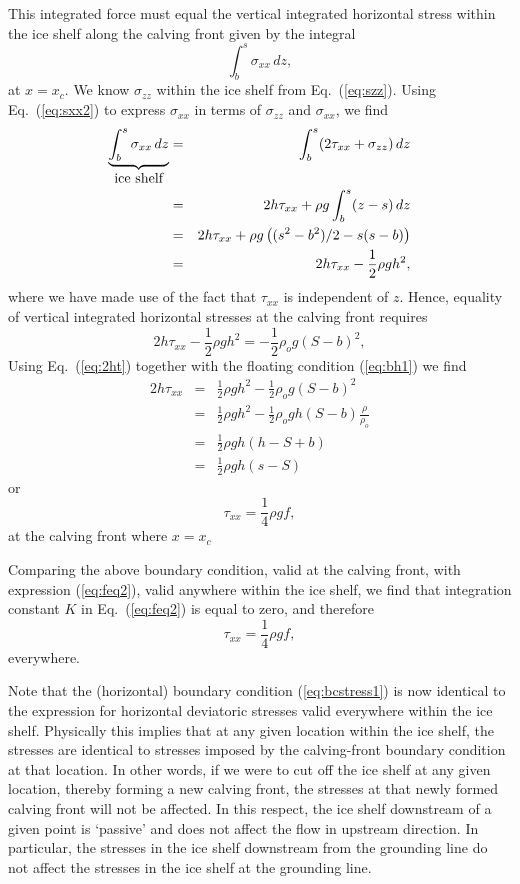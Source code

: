 \documentclass[10pt,a4paper]{book}
\newcommand{\sxx}{\sigma_{xx}}
\newcommand{\szz}{\sigma_{zz}}
\begin{document}
This integrated force must equal the vertical integrated horizontal
stress within the ice shelf along the calving front given by the
integral
\[
\int_{b}^{s} \sigma_{xx} \, dz ,
\] 
at $x=x_c$. We know $\szz$ within the ice shelf from Eq.~(\ref{eq:szz}). Using  Eq.~(\ref{eq:sxx2}) to express
$\sxx$ in terms of $\szz$ and $\sxx$, we find
\begin{eqnarray}
\underbrace{\int_{b}^{s} \sigma_{xx} \, dz}_{\hbox{ice shelf}} &=& \int_{b}^{s} (2 \tau_{xx}+  \sigma_{zz}) \, dz \nonumber \\
&=& 2 h \tau_{xx}+ \rho g \int_{b}^{s} (z-s) \, dz \nonumber \\
&=& 2 h \tau_{xx}+ \rho g \left ((s^2-b^2)/2-s(s-b) \right ) \nonumber \\
&=& 2 h \tau_{xx} - \frac{1}{2} \rho g h^2 , 
\end{eqnarray}
where we have made use of the fact that $\tau_{xx}$ is independent of $z$.
Hence, equality of vertical integrated horizontal stresses at the calving front requires
\begin{equation}
2 h \tau_{xx} - \frac{1}{2} \rho g h^2 = -\frac{1}{2} \rho_o g  (S-b)^2 ,
\label{eq:2ht}
\end{equation}
Using Eq.~(\ref{eq:2ht}) together with the floating condition (\ref{eq:bh1}) we find
\begin{eqnarray}
2 h \tau_{xx} &=& \frac{1}{2} \rho g h^2 - \frac{1}{2} \rho_o g  (S-b)^2 \nonumber \\
          &=& \frac{1}{2} \rho g h^2 - \frac{1}{2} \rho_o g   h  (S-b)\frac{\rho}{\rho_o} \nonumber \\ 
     &=& \frac{1}{2} \rho g h (h - S + b) \nonumber \\
     &=& \frac{1}{2} \rho g h (s-S) \nonumber 
\end{eqnarray}
or 
\begin{equation}
\tau_{xx}= \frac{1}{4} \rho g f  \label{eq:bcstress1},
\end{equation}
at the calving front where $x=x_c$

Comparing the above boundary condition, valid at the calving front, with expression
(\ref{eq:feq2}), valid anywhere within the ice shelf, we find that integration constant $K$ in
Eq.~(\ref{eq:feq2}) is equal to zero, and therefore
\[
\tau_{xx} = \frac{1}{4} \rho g f ,
\] 
everywhere. 

Note that the (horizontal) boundary condition (\ref{eq:bcstress1}) is
now identical to the expression for horizontal deviatoric stresses
valid everywhere within the ice shelf.  Physically this implies that
at any given location within the ice shelf, the stresses are identical
to stresses imposed by the calving-front boundary condition at that
location. In other words, if we were to cut off the ice shelf at any
given location, thereby forming a new calving front, the stresses at
that newly formed calving front will not be affected.  In this
respect, the ice shelf downstream of a given point is `passive' and
does not affect the flow in upstream direction. In particular, the
stresses in the ice shelf downstream from the grounding line do not
affect the stresses in the ice shelf at the grounding line.
\end{document}
